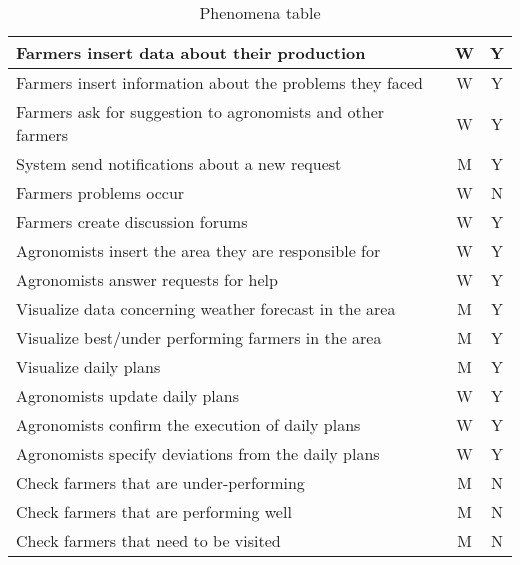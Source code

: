 \begin{table}[H]
\begin{tabular}{|l|c|c|}
        \hline
        Farmers insert data about their production                         &   W   &   Y \\
        \hline
        Farmers insert information about the problems they faced                          &   W   &   Y \\
        \hline
        Farmers ask for suggestion to agronomists and other farmers          &   W   &   Y \\
        \hline
        System send notifications about a new request          &   M   &   Y \\
        \hline
        Farmers problems occur                                     &   W   &   N \\
        \hline
        Farmers create discussion forums                                   &   W   &   Y \\
        \hline
        Agronomists insert the area they are responsible for                  &   W   &   Y \\
        \hline
        Agronomists answer requests for help                                  &   W   &   Y \\
        \hline
        Visualize data concerning weather forecast in the area          &   M   &   Y \\
        \hline
        Visualize best/under performing farmers in the area             &   M   &   Y \\
        \hline
        Visualize daily plans                                            &   M   &   Y \\
        \hline
        Agronomists update daily plans                                               &   W   &   Y \\
        \hline
        Agronomists confirm the execution of daily plans                         &   W   &   Y \\
        \hline
        Agronomists specify deviations from the daily plans                                 &   W   &   Y \\
        \hline
        Check farmers that are under-performing                         &   M   &   N \\
        \hline
        Check farmers that are performing well                          &   M   &   N \\
        \hline
        Check farmers that need to be visited                             &   M   &   N \\
        \hline
    \end{tabular}
    
    \caption{\label{tab:phenomena_table}Phenomena table}
    
\end{table}

